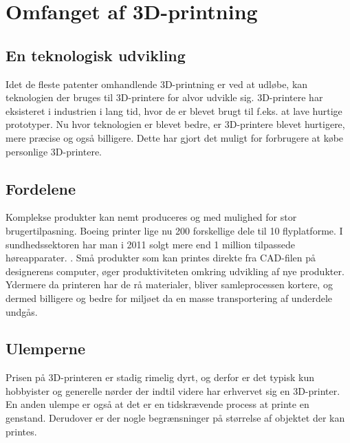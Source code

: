 \chapter{Omfanget af 3D-printning} %
\label{cha:omfanget_af_3d_printer}

\section{En teknologisk udvikling} %
\label{par:en_teknologisk_udvikling}



Idet de fleste patenter omhandlende 3D-printning er ved at udløbe, kan teknologien der bruges til 3D-printere for alvor udvikle sig. 3D-printere har eksisteret i industrien i lang tid, hvor de er blevet brugt til f.eks. at lave hurtige prototyper. Nu hvor teknologien er blevet bedre, er 3D-printere blevet hurtigere, mere præcise og også billigere. Dette har gjort det muligt for forbrugere at købe personlige 3D-printere. 




\section{Fordelene} %
\label{sec:fordelene}


Komplekse produkter kan nemt produceres og med mulighed for stor brugertilpasning. Boeing printer lige nu 200 forskellige dele til 10 flyplatforme. I sundhedssektoren har man i 2011 solgt mere end 1 million tilpassede høreapparater. \cite{manyika_disruptive_2013}. Små produkter som kan printes direkte fra CAD-filen på designerens computer, øger produktiviteten omkring udvikling af nye produkter. Ydermere da printeren har de rå materialer, bliver samleprocessen kortere, og dermed billigere og bedre for miljøet da en masse transportering af underdele undgås.






\section{Ulemperne} %
\label{par:ulemperne}


Prisen på 3D-printeren er stadig rimelig dyrt, og derfor er det typisk kun hobbyister og generelle nørder der indtil videre har erhvervet sig en 3D-printer. En anden ulempe er også at det er en tidskrævende process at printe en genstand. Derudover er der nogle begrænsninger på størrelse af objektet der kan printes.


